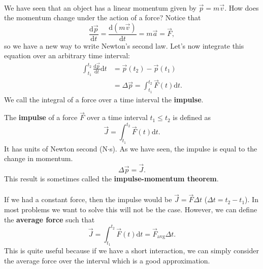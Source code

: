 \documentclass[../classical_mechanics.tex]{subfiles}
\begin{document}
        \paragraph{}
        We have seen that an object has a linear momentum given by $\vec{p}=m\vec{v}$.
        How does the momentum change under the action of a force?
        Notice that
        \begin{equation}
            \frac{\mathrm{d}\vec{p}}{\mathrm{d}t}=\frac{\mathrm{d}(m\vec{v})}{\mathrm{d}t}=m\vec{a}=\vec{F},
        \end{equation}
        so we have a new way to write Newton's second law.
        Let's now integrate this equation over an arbitrary time interval:
        \begin{align}
            \int_{t_1}^{t_2}\frac{\mathrm{d}\vec{p}}{\mathrm{d}t}\mathrm{d}t &= \vec{p}(t_2) - \vec{p}(t_1) \\
            &= \Delta\vec{p} = \int_{t_1}^{t_2}\vec{F}(t)\mathrm{d}t.
        \end{align}
        We call the integral of a force over a time interval the \textbf{impulse}.
        \begin{definition}
            The \textbf{impulse} of a force $\vec{F}$ over a time interval $t_1\leq t_2$ is defined as
            \begin{equation}
                \vec{J}=\int_{t_1}^{t_2}\vec{F}(t)\mathrm{d}t.
            \end{equation}
            It has units of Newton second (N$\cdot$s). As we have seen, the impulse is equal to the change in momentum.
            \begin{equation}
                \Delta\vec{p}=\vec{J}.
            \end{equation}
            This result is sometimes called the \textbf{impulse-momentum theorem}.
        \end{definition}

        \paragraph{}
        If we had a constant force, then the impulse would be $\vec{J}=\vec{F}\Delta t$ ($\Delta t=t_2-t_1$).
        In most problems we want to solve this will not be the case. However, we can define the \textbf{average force} such that
        \begin{equation}
            \vec{J}=\int_{t_1}^{t_2}\vec{F}(t)\mathrm{d}t=\vec{F}_\text{avg}\Delta t.
        \end{equation}
        This is quite useful because if we have a short interaction, we can simply consider the average force over the interval which is a good approximation.
\end{document}
